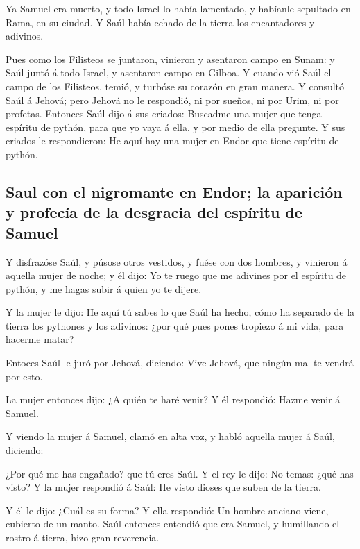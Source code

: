  Ya Samuel era muerto, y todo Israel lo había lamentado, y
habíanle sepultado en Rama, en su ciudad. Y Saúl había echado de la
tierra los encantadores y adivinos.

 Pues como los Filisteos se juntaron, vinieron y asentaron
campo en Sunam: y Saúl juntó á todo Israel, y asentaron campo en Gilboa.
 Y cuando vió Saúl el campo de los Filisteos, temió, y
turbóse su corazón en gran manera.  Y consultó Saúl á
Jehová; pero Jehová no le respondió, ni por sueños, ni por Urim, ni por
profetas.  Entonces Saúl dijo á sus criados: Buscadme una
mujer que tenga espíritu de pythón, para que yo vaya á ella, y por medio
de ella pregunte. Y sus criados le respondieron: He aquí hay una mujer
en Endor que tiene espíritu de pythón.

\hypertarget{saul-con-el-nigromante-en-endor-la-apariciuxf3n-y-profecuxeda-de-la-desgracia-del-espuxedritu-de-samuel}{%
\subsection{Saul con el nigromante en Endor; la aparición y profecía de
la desgracia del espíritu de
Samuel}\label{saul-con-el-nigromante-en-endor-la-apariciuxf3n-y-profecuxeda-de-la-desgracia-del-espuxedritu-de-samuel}}

 Y disfrazóse Saúl, y púsose otros vestidos, y fuése con dos
hombres, y vinieron á aquella mujer de noche; y él dijo: Yo te ruego que
me adivines por el espíritu de pythón, y me hagas subir á quien yo te
dijere.

 Y la mujer le dijo: He aquí tú sabes lo que Saúl ha hecho,
cómo ha separado de la tierra los pythones y los adivinos: ¿por qué pues
pones tropiezo á mi vida, para hacerme matar?

 Entoces Saúl le juró por Jehová, diciendo: Vive Jehová,
que ningún mal te vendrá por esto.

 La mujer entonces dijo: ¿A quién te haré venir? Y él
respondió: Hazme venir á Samuel.

 Y viendo la mujer á Samuel, clamó en alta voz, y habló
aquella mujer á Saúl, diciendo:

 ¿Por qué me has engañado? que tú eres Saúl. Y el rey le
dijo: No temas: ¿qué has visto? Y la mujer respondió á Saúl: He visto
dioses que suben de la tierra.

 Y él le dijo: ¿Cuál es su forma? Y ella respondió: Un
hombre anciano viene, cubierto de un manto. Saúl entonces entendió que
era Samuel, y humillando el rostro á tierra, hizo gran reverencia.

